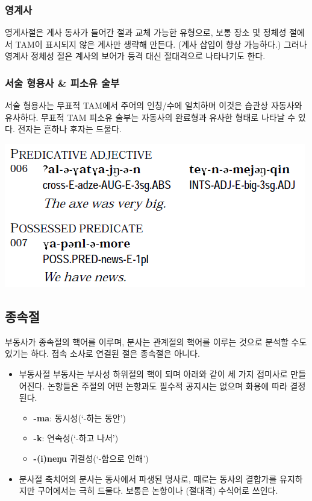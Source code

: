 \subsubsection{영계사}
영계사절은 계사 동사가 들어간 절과 교체 가능한 유형으로, 보통 장소 및 정체성 절에서 TAM이 표시되지 않은 계사만 생략해 만든다. (계사 삽입이 항상 가능하다.) 그러나 영계사 정체성 절은 계사의 보어가 등격 대신 절대격으로 나타나기도 한다.
\subsubsection{서술 형용사 \& 피소유 술부}
서술 형용사는 무표적 TAM에서 주어의 인칭/수에 일치하며 이것은 습관상 자동사와 유사하다. 무표적 TAM 피소유 술부는 자동사의 완료형과 유사한 형태로 나타날 수 있다. 전자는 흔하나 후자는 드물다.
\begin{center}
\includegraphics{Chukchi/src/chnc.png}
\end{center}
\subsection{종속절}
부동사가 종속절의 핵어를 이루며, 분사는 관계절의 핵어를 이루는 것으로 분석할 수도 있기는 하다. 접속 소사로 연결된 절은 종속절은 아니다.
\begin{itemize}
	\item{부동사절} 부동사는 부사성 하위절의 핵이 되며 아래와 같이 세 가지 접미사로 만들어진다. 논항들은 주절의 어떤 논항과도 필수적 공지시는 없으며 화용에 따라 결정된다. 
	\begin{itemize}
		\item \textbf{-ma}: 동시성(`-하는 동안')
		\item \textbf{-k}: 연속성(`-하고 나서')
		\item \textbf{-(i)neŋu} 귀결성(`-함으로 인해')
	\end{itemize}
	\item{분사절} 축치어의 분사는 동사에서 파생된 명사로, 때로는 동사의 결합가를 유지하지만 구어에서는 극히 드물다. 보통은 논항이나 (절대격) 수식어로 쓰인다.
\end{itemize}
